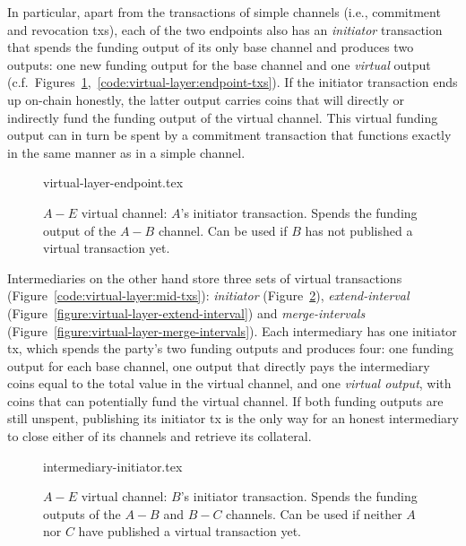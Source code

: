   In particular, apart from the transactions of simple channels (i.e.,
  commitment and revocation txs), each of the two
  endpoints also has an \emph{initiator} transaction that spends the funding output
  of its only base channel and produces two outputs: one new funding output for
  the base channel and one \emph{virtual} output (c.f.\
  Figures~\ref{figure:virtual-layer-endpoint},~\ref{code:virtual-layer:endpoint-txs}).
  If the initiator transaction ends up on-chain honestly, the latter output
  carries coins that will directly or indirectly fund the funding output of the
  virtual channel. This virtual funding output can in turn be spent by a
  commitment transaction that functions exactly in the same manner as in a
  simple channel.

  \begin{figure}
    {virtual-layer-endpoint.tex}
    \caption{$A-E$ virtual channel: $A$'s initiator transaction. Spends the
    funding output of the $A-B$ channel. Can be used if $B$ has not published
    a virtual transaction yet.}
    \label{figure:virtual-layer-endpoint}
  \end{figure}

  Intermediaries on the other hand store three sets of virtual transactions
  (Figure~\ref{code:virtual-layer:mid-txs}): \emph{initiator}
  (Figure~\ref{figure:virtual-layer-initiator}), \emph{extend-interval}
  (Figure~\ref{figure:virtual-layer-extend-interval}) and \emph{merge-intervals}
  (Figure~\ref{figure:virtual-layer-merge-intervals}). Each intermediary has one
  initiator tx, which spends the party's two funding outputs and produces four:
  one funding output for each base channel, one output that directly pays the
  intermediary coins equal to the total value in the virtual channel, and one
  \emph{virtual output}, with coins that can potentially fund the virtual
  channel. If both funding outputs are still unspent, publishing its initiator
  tx is the only way for an honest intermediary to close either of its channels
  and retrieve its collateral.

  \begin{figure}
    {intermediary-initiator.tex}
    \caption{$A-E$ virtual channel: $B$'s initiator transaction. Spends the
    funding outputs of the $A-B$ and $B-C$ channels. Can be used if neither
    $A$ nor $C$ have published a virtual transaction yet.}
    \label{figure:virtual-layer-initiator}
  \end{figure}

